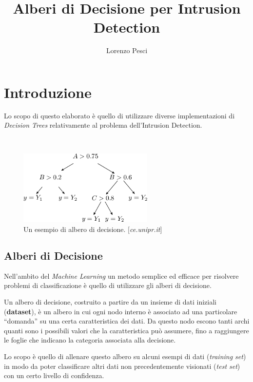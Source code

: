 \documentclass[a4paper,12pt]{article}
\title{Alberi di Decisione per Intrusion Detection}
\author{Lorenzo Pesci}
\begin{document}
\maketitle

\section{Introduzione}
Lo scopo di questo elaborato è quello di utilizzare diverse implementazioni di \textit{Decision Trees} relativamente al problema dell'Intrusion Detection.

\
\begin{figure}[h]
    \centering
    \captionsetup{justification=centering, margin=1cm}
    \includegraphics[width=0.6\textwidth]{./fig_decisiontree}
    \vspace*{5mm}
    \caption{Un esempio di albero di decisione. [\textit{ce.unipr.it}]}
    \label{fig:dec}
\end{figure}

\subsection{Alberi di Decisione}

Nell’ambito del \textit{Machine Learning} un metodo semplice ed efficace per risolvere problemi di classificazione è quello di utilizzare gli alberi di decisione.
\newline

Un albero di decisione, costruito a partire da un insieme di dati iniziali (\textbf{dataset}), è un albero in cui ogni nodo interno è associato ad una particolare “domanda” su una certa caratteristica dei dati. Da questo nodo escono tanti archi quanti sono i possibili valori che la caratteristica può assumere, fino a raggiungere le foglie che indicano la categoria associata alla decisione.
\newline

Lo scopo è quello di allenare questo albero su alcuni esempi di dati (\textit{training set}) in modo da poter classificare altri dati non precedentemente visionati (\textit{test set}) con un certo livello di confidenza.
\newline
\end{document}
